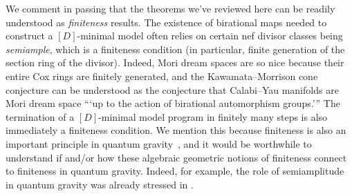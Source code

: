 \documentclass[11pt,dvipsnames]{article}
\theoremstyle{definition}
\begin{document}
We comment in passing that the theorems we've reviewed here can be readily understood as \textit{finiteness} results. The existence of birational maps needed to construct a $[D]$-minimal model often relies on certain nef divisor classes being \textit{semiample}, which is a finiteness condition (in particular, finite generation of the section ring of the divisor). Indeed, Mori dream spaces are so nice because their entire Cox rings are finitely generated, and the Kawamata--Morrison cone conjecture \cite{AST_1993__218__243_0,kawamataCone} can be understood as the conjecture that Calabi--Yau manifolds are Mori dream space {``}`up to the action of birational automorphism groups.'{''} The termination of a $[D]$-minimal model program in finitely many steps is also immediately a finiteness condition. We mention this because finiteness is also an important principle in quantum gravity~\cite{Vafa:2005ui,Hamada:2021yxy,Grimm:2020cda,Tarazi:2021duw,Kim:2024eoa,Delgado:2024skw,Agmon:2022thq,Grimm:2021vpn,Grimm:2023lrf}, and it would be worthwhile to understand if and/or how these algebraic geometric notions of finiteness connect to finiteness in quantum gravity. Indeed, for example, the role of semiamplitude in quantum gravity was already stressed in \cite{Katz:2020ewz}.
\end{document}
